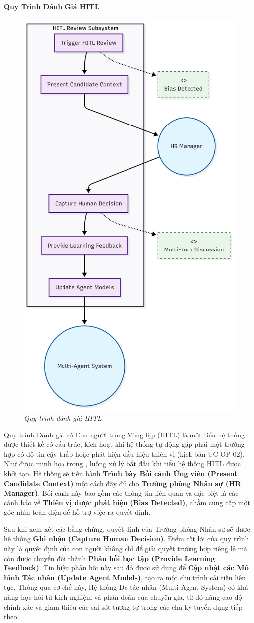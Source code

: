 \documentclass{article}
\begin{document}
\paragraph{Quy Trình Đánh Giá HITL}
\begin{figure}[H]
    \centering
    \includegraphics[width=0.5\linewidth]{img/hitl-review.png}
    \caption{\textit{Quy trình đánh giá HITL}}
    \label{fig:hitl-review}
\end{figure}

Quy trình Đánh giá có Con người trong Vòng lặp (HITL) là một tiểu hệ thống được thiết kế có cấu trúc, kích hoạt khi hệ thống tự động gặp phải một trường hợp có độ tin cậy thấp hoặc phát hiện dấu hiệu thiên vị (kịch bản UC-OP-02). Như được minh họa trong \hyperref[fig:hitl-review]{\color{blue}{Hình 4.2}}, luồng xử lý bắt đầu khi tiểu hệ thống HITL được khởi tạo. Hệ thống sẽ tiến hành \textbf{Trình bày Bối cảnh Ứng viên (Present Candidate Context)} một cách đầy đủ cho \textbf{Trưởng phòng Nhân sự (HR Manager)}. Bối cảnh này bao gồm các thông tin liên quan và đặc biệt là các cảnh báo về \textbf{Thiên vị được phát hiện (Bias Detected)}, nhằm cung cấp một góc nhìn toàn diện để hỗ trợ việc ra quyết định.

Sau khi xem xét các bằng chứng, quyết định của Trưởng phòng Nhân sự sẽ được hệ thống \textbf{Ghi nhận (Capture Human Decision)}. Điểm cốt lõi của quy trình này là quyết định của con người không chỉ để giải quyết trường hợp riêng lẻ mà còn được chuyển đổi thành \textbf{Phản hồi học tập (Provide Learning Feedback)}. Tín hiệu phản hồi này sau đó được sử dụng để \textbf{Cập nhật các Mô hình Tác nhân (Update Agent Models)}, tạo ra một chu trình cải tiến liên tục. Thông qua cơ chế này, Hệ thống Đa tác nhân (Multi-Agent System) có khả năng học hỏi từ kinh nghiệm và phán đoán của chuyên gia, từ đó nâng cao độ chính xác và giảm thiểu các sai sót tương tự trong các chu kỳ tuyển dụng tiếp theo.
\end{document}

